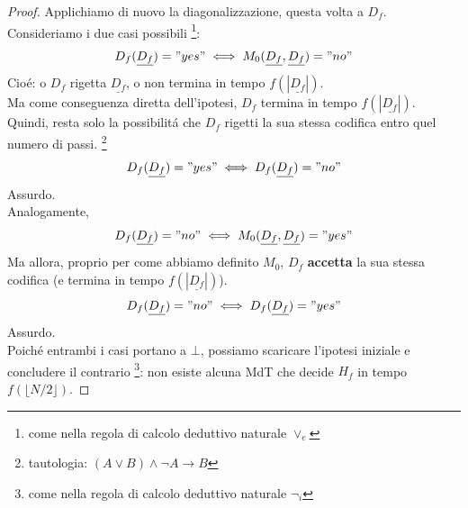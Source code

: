 \begin{proof}
Applichiamo di nuovo la diagonalizzazione, questa volta a $D_f$.
Consideriamo i due casi possibili \footnote{come nella regola di calcolo deduttivo naturale $\lor_e$}:
\[ D_f(\underline{D_f}) = "yes" \iff M_0(\underline{D_f}, \underline{D_f}) = "no" \]
Cioé: o $D_f$ rigetta $\underline{D_f}$, o non termina in tempo $f(|\underline{D_f}|)$. \\
Ma come conseguenza diretta dell'ipotesi, $D_f$ termina in tempo $f(|\underline{D_f}|)$. 
Quindi, resta solo la possibilitá che $D_f$ rigetti la sua stessa codifica entro quel numero di passi.
\footnote{tautologia: $(A \lor B ) \land \neg A \rightarrow B$} \\
\[ D_f(\underline{D_f}) = "yes" \iff D_f(\underline{D_f}) = "no" \]
Assurdo. \\

Analogamente, 
\[ D_f(\underline{D_f}) = "no" \iff M_0(\underline{D_f}, \underline{D_f}) = "yes" \]
Ma allora, proprio per come abbiamo definito $M_0$, $D_f$ \textbf{accetta} la sua stessa codifica (e termina in tempo $f(|\underline{D_f}|)$).
\[D_f(\underline{D_f}) = "no" \iff D_f(\underline{D_f}) = "yes"\]
Assurdo. \\

Poiché entrambi i casi portano a $\bot$, possiamo scaricare l'ipotesi iniziale e concludere il contrario
\footnote{come nella regola di calcolo deduttivo naturale $\neg_i$}: 
non esiste alcuna MdT che decide $H_f$ in tempo $f(\lfloor N/2 \rfloor)$.
\end{proof}

